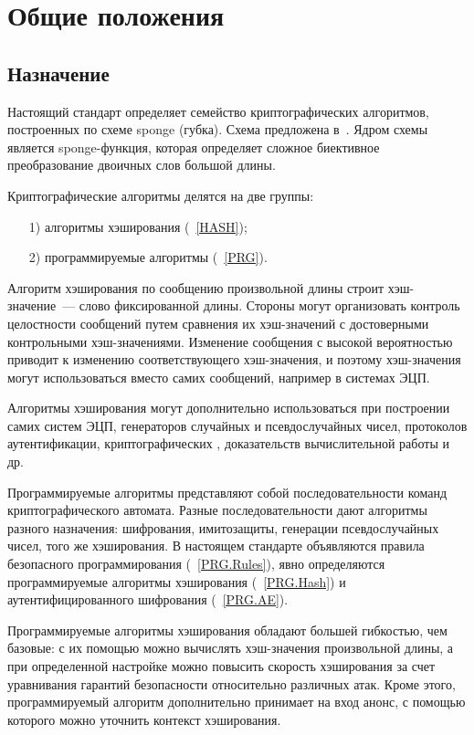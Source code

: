 \chapter{Общие положения}\label{COMMON}

\section{Назначение}

Настоящий стандарт определяет семейство криптографических алгоритмов,
построенных по схеме sponge (губка). Схема предложена в~\cite{Sponge}. 
Ядром схемы является sponge-функция, которая определяет сложное биективное 
преобразование двоичных слов большой длины. 

Криптографические алгоритмы делятся на две группы:
\begin{enumerate}
\item[1)]
алгоритмы хэширования (~\ref{HASH});
\item[2)]
программируемые алгоритмы (~\ref{PRG}).
\end{enumerate}

Алгоритм хэширования по сообщению произвольной длины строит 
хэш-значение~--- слово фиксированной длины.
%
Стороны могут организовать контроль целостности сообщений
путем сравнения их хэш-значений с достоверными контрольными хэш-значениями.
%
Изменение сообщения с высокой вероятностью приводит к изменению
соответствующего хэш-значения, и поэтому хэш-значения могут использоваться
вместо самих сообщений, например в системах ЭЦП.

Алгоритмы хэширования могут дополнительно использоваться при построении 
самих систем ЭЦП, генераторов случайных и псевдослучайных чисел, 
протоколов аутентификации,
криптографических , 
доказательств вычислительной работы и др.

Программируемые алгоритмы представляют собой последовательности команд 
криптографического автомата. Разные последовательности дают алгоритмы разного 
назначения: шифрования, имитозащиты, генерации псевдослучайных чисел, 
того же хэширования.
%
В настоящем стандарте объявляются 
правила безопасного программирования (~\ref{PRG.Rules}),
явно определяются программируемые алгоритмы хэширования (~\ref{PRG.Hash}) 
и аутентифицированного шифрования (~\ref{PRG.AE}).

Программируемые алгоритмы хэширования обладают большей гибкостью, 
чем базовые: с их помощью можно вычислять хэш-значения произвольной длины,
а при определенной настройке можно повысить скорость хэширования 
за счет уравнивания гарантий безопасности относительно различных атак.
%
Кроме этого, программируемый алгоритм дополнительно принимает на вход анонс,
с помощью которого можно уточнить контекст хэширования.


